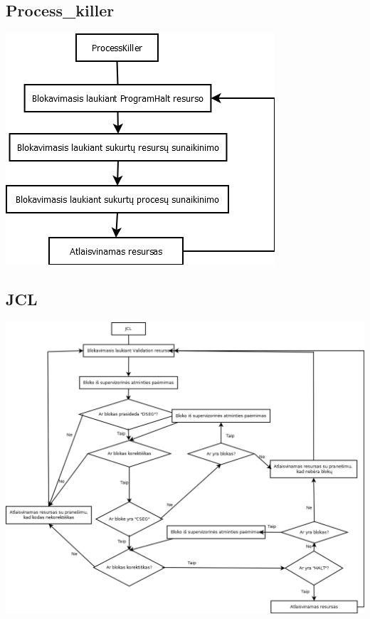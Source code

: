 	\subsection{Process\_killer}
		\begin{center}
			\includegraphics[scale=0.9]{diagramos/processKiller.png}
		\end{center}
	\subsection{JCL}
		\begin{center}
			\includegraphics[scale=0.4]{diagramos/JCL.png}
		\end{center}

